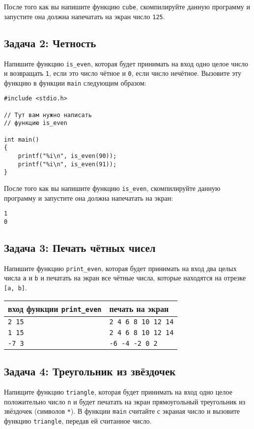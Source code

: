 \documentclass{article}
\begin{document}
После того как вы напишите функцию \texttt{cube}, скомпилируйте данную программу и запустите она должна напечатать на экран число \texttt{125}.


\subsection*{Задача 2: Четность}
Напишите функцию \texttt{is\_even}, которая будет принимать на вход одно целое число и возвращать \texttt{1}, если это число чётное и \texttt{0}, если число нечётное. Вызовите эту функцию в функции \texttt{main} следующим образом:
\begin{lstlisting}
#include <stdio.h>

// Тут вам нужно написать
// функцию is_even

int main()
{
    printf("%i\n", is_even(90));
    printf("%i\n", is_even(91));
}
\end{lstlisting}
После того как вы напишите функцию \texttt{is\_even}, скомпилируйте данную программу и запустите она должна напечатать на экран:
\begin{verbatim}
1
0
\end{verbatim}

\subsection*{Задача 3: Печать чётных чисел}
Напишите функцию \texttt{print\_even}, которая будет принимать на вход два целых числа \texttt{a} и \texttt{b} и печатать на экран все чётные числа, которые находятся на отрезке \texttt{[a, b]}.

\begin{center}
\begin{tabular}{ l | l }
 вход функции \texttt{print\_even} & печать на экран \\ \hline
 \texttt{2 15} & \texttt{2 4 6 8 10 12 14}  \\
 \texttt{1 15} & \texttt{2 4 6 8 10 12 14}  \\  
 \texttt{-7 3} & \texttt{-6 -4 -2 0 2}  \\
\end{tabular}
\end{center}

\newpage
\subsection*{Задача 4: Треугольник из звёздочек}
Напищите функцию \texttt{triangle}, которая будет принимать на вход одно целое положительно число \texttt{n} и будет печатать на экран прямоугольный треугольник из звёздочек (символов \texttt{*}). В функции \texttt{main} считайте с экраная число и вызовите функцию \texttt{triangle}, передав ей считанное число.
\end{document}
